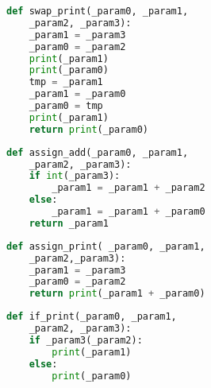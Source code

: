 \begin{figure}
    \begin{subfigure}[t]{0.45\textwidth}
        \begin{lstlisting}[language=Python, firstnumber=1]
def swap_print(_param0, _param1,
    _param2, _param3):
    _param1 = _param3
    _param0 = _param2
    print(_param1)
    print(_param0)
    tmp = _param1
    _param1 = _param0
    _param0 = tmp
    print(_param1)
    return print(_param0)
        \end{lstlisting}
        \label{fig:func1}
    \end{subfigure}\hfill
    \begin{subfigure}[t]{0.45\textwidth}
        \begin{lstlisting}[language=Python, firstnumber=1]
def assign_add(_param0, _param1,
    _param2, _param3):
    if int(_param3):
        _param1 = _param1 + _param2
    else:
        _param1 = _param1 + _param0
    return _param1
        \end{lstlisting}
        \label{fig:func2}
    \end{subfigure}
    
    \vspace{0.5cm} %
    
    \begin{subfigure}[t]{0.45\textwidth}
        \begin{lstlisting}[language=Python, firstnumber=1]
def assign_print( _param0, _param1,
    _param2,_param3):
    _param1 = _param3
    _param0 = _param2
    return print(_param1 + _param0)
        \end{lstlisting}
        \label{fig:func3}
    \end{subfigure}\hfill
    \begin{subfigure}[t]{0.45\textwidth}
        \begin{lstlisting}[language=Python, firstnumber=1]
def if_print(_param0, _param1,
    _param2, _param3):
    if _param3(_param2):
        print(_param1)
    else:
        print(_param0)
        \end{lstlisting}
        \label{fig:func4}
    \end{subfigure}
    
    \vspace{0.5cm} %
    

\end{figure}
